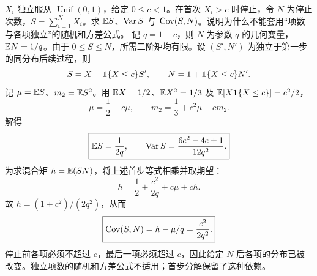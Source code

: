 $X_i$ 独立服从 $\operatorname{Unif}(0,1)$，给定 $0\le c<1$。在首次 $X_i>c$ 时停止，令 $N$ 为停止次数，$S=\sum_{i=1}^NX_i$。求 $\mathbb{E} S$、$\operatorname{Var} S$ 与 $\operatorname{Cov}(S,N)$。说明为什么不能套用“项数与各项独立”的随机和方差公式。
\solution 记 $q=1-c$，则 $N$ 为参数 $q$ 的几何变量，$\mathbb{E} N=1/q$。由于 $0\le S\le N$，所需二阶矩均有限。设 $(S',N')$ 为独立于第一步的同分布后续过程，则
\[
S=X+\mathbf{1}\{X\le c\}S',\qquad
N=1+\mathbf{1}\{X\le c\}N'.
\]
记 $\mu=\mathbb{E} S$、$m_2=\mathbb{E} S^2$。用 $\mathbb{E} X=1/2$、$\mathbb{E} X^2=1/3$ 及 $\mathbb{E}[X\mathbf{1}\{X\le c\}]=c^2/2$，
\[
\mu=\frac12+c\mu,\qquad
m_2=\frac13+c^2\mu+cm_2.
\]
解得
\[
\boxed{\mathbb{E} S=\frac1{2q},\qquad
\operatorname{Var} S=\frac{6c^2-4c+1}{12q^2}.}
\]
为求混合矩 $h=\mathbb{E}(SN)$，将上述首步等式相乘并取期望：
\[
h=\frac12+\frac{c^2}{2q}+c\mu+ch.
\]
故 $h=(1+c^2)/(2q^2)$，从而
\[
\boxed{\operatorname{Cov}(S,N)=h-\mu/q=\frac{c^2}{2q^2}.}
\]
\pitfall 停止前各项必须不超过 $c$，最后一项必须超过 $c$，因此给定 $N$ 后各项的分布已被改变。独立项数的随机和方差公式不适用；首步分解保留了这种依赖。
